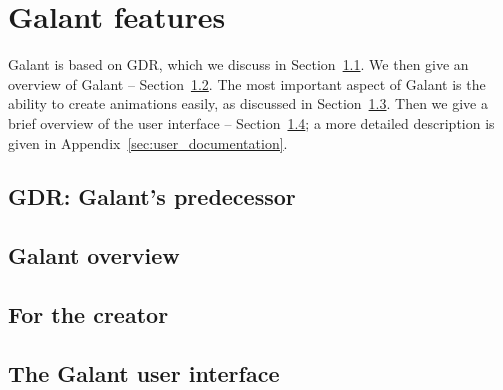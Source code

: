 \section{Galant features}\label{sec:galant_features}

Galant is based on GDR, which we discuss in Section~\ref{sec:gdr_features}.
We then give an overview of Galant -- Section~\ref{sec:galant_overview}.
The most important aspect of Galant is the ability to create animations easily,
as discussed in Section~\ref{sec:creator}.
Then we give a brief overview of the user interface --
Section~\ref{sec:user_interface}; a more detailed description is given in Appendix~\ref{sec:user_documentation}.

\subsection{GDR: Galant's predecessor}
\label{sec:gdr_features}


\subsection{Galant overview}
\label{sec:galant_overview}


\subsection{For the creator}
\label{sec:creator}


%

\subsection{The Galant user interface}
\label{sec:user_interface}



